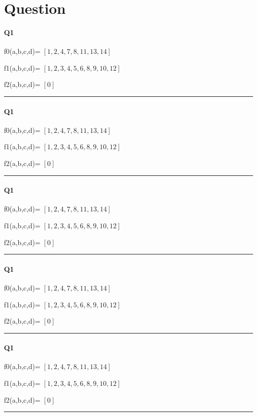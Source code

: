 
\section{Question}

\paragraph{Q1}


f0(a,b,c,d)= $[1, 2, 4, 7, 8, 11, 13, 14]$

f1(a,b,c,d)= $[1, 2, 3, 4, 5, 6, 8, 9, 10, 12]$

f2(a,b,c,d)= $[0]$


\hrule width 1\linewidth
\paragraph{Q1}


f0(a,b,c,d)= $[1, 2, 4, 7, 8, 11, 13, 14]$

f1(a,b,c,d)= $[1, 2, 3, 4, 5, 6, 8, 9, 10, 12]$

f2(a,b,c,d)= $[0]$


\hrule width 1\linewidth
\paragraph{Q1}


f0(a,b,c,d)= $[1, 2, 4, 7, 8, 11, 13, 14]$

f1(a,b,c,d)= $[1, 2, 3, 4, 5, 6, 8, 9, 10, 12]$

f2(a,b,c,d)= $[0]$


\hrule width 1\linewidth
\paragraph{Q1}


f0(a,b,c,d)= $[1, 2, 4, 7, 8, 11, 13, 14]$

f1(a,b,c,d)= $[1, 2, 3, 4, 5, 6, 8, 9, 10, 12]$

f2(a,b,c,d)= $[0]$


\hrule width 1\linewidth
\paragraph{Q1}


f0(a,b,c,d)= $[1, 2, 4, 7, 8, 11, 13, 14]$

f1(a,b,c,d)= $[1, 2, 3, 4, 5, 6, 8, 9, 10, 12]$

f2(a,b,c,d)= $[0]$


\hrule width 1\linewidth\pagebreak
